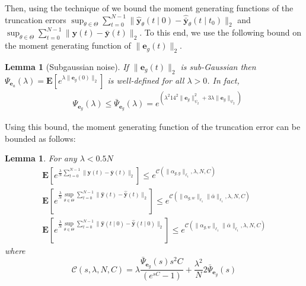 \documentclass{article}
\def\rve{{\mathbf{e}}}
\def\rvy{{\mathbf{y}}}
\newtheorem{lemma}[theorem]{Lemma}
\newcommand{\e}{\mathbf{e}}
\newcommand{\y}{\mathbf{y}}
\newcommand{\bE}{\mathbf{E}}
\begin{document}
Then, using the technique of \cite{alquier2012pred} we bound the moment generating functions of 
the truncation errors $\sup_{\theta \in \Theta} \sum_{t=0}^{N-1} \|\hat{\rvy}_{\theta}(t \mid 0)-\hat{\bar{\rvy}}_{\theta}(t \mid t_0)\|_2$
and $\sup_{\theta \in \Theta} \sum_{t=0}^{N-1} \|\rvy(t)-\bar{\rvy}(t)\|_2$. To this end, we use the following bound on the 
moment generating function of $\|\e_g(t)\|_2$.
\begin{lemma}[Subgaussian noise]
\label{lemma:subgauss:Cramer}
If
$\|\e_g(t)\|_2$ is sub-Gaussian  then
$\Psi_{\e_a}(\lambda)=\bE[e^{\lambda \|\e_g(0)\|_2}]$ 
 is well-defined for all $\lambda > 0$.
In fact, %
\begin{align*}
& \Psi_{\e_g}(\lambda) \le  \bar{\Psi}_{\rve_g}(\lambda)=e^{(\lambda^2 14^2 \|\rve_g\|_{\psi_2}^2+3\lambda \|\rve_g\|_{\psi_2})}
\end{align*}
\end{lemma}
Using this bound, the moment generating function of the  truncation error can be bounded as follows:
\begin{lemma}
 \label{basic_lemma:lipschitz2}
 For any $\lambda < 0.5N$ 
\begin{align*} 
  \bE[e^{\frac{\lambda}{N} \sum_{t=0}^{N-1}\|\y(t)-\bar{\y}(t)\|_2}] \le e^{\mathcal{C}(\|\alpha_{g,y}\|_{\ell_1},\lambda,N,C)} \\
  \bE[e^{\frac{\lambda}{N} \sup_{\theta \in \Theta}\sum_{t=0}^{N-1} \|\hat{\y}(t)-\hat{\bar{\y}}(t)\|_2}] \le e^{\mathcal{C}(\|\alpha_{g,w}\|_{\ell_1}\|\bar{\alpha}\|_{\ell_1},\lambda,N,C)} \\
\bE[e^{\frac{\lambda}{N} \sup_{\theta \in \Theta}\sum_{t=0}^{N-1} \|\hat{\y}(t \mid 0  )-\hat{\bar{\y}}(t \mid 0 )\|_2}] \le e^{\mathcal{C}(\|\alpha_{g,w}\|_{\ell_1}\|\bar{\alpha}\|_{\ell_1},\lambda,N,C)}
\end{align*}
where
\begin{equation}
\label{basic_lemma:lipschitz2:theo:eq1}
   \mathcal{C}(s,\lambda,N,C)=\lambda \frac{\bar{\Psi}_{\rve_g}(s)s^2C}{(e^{sC}-1)}+
     \frac{\lambda^2}{N} 2\bar{\Psi}_{\rve_g}( s)
\end{equation}
\end{lemma}
\end{document}
